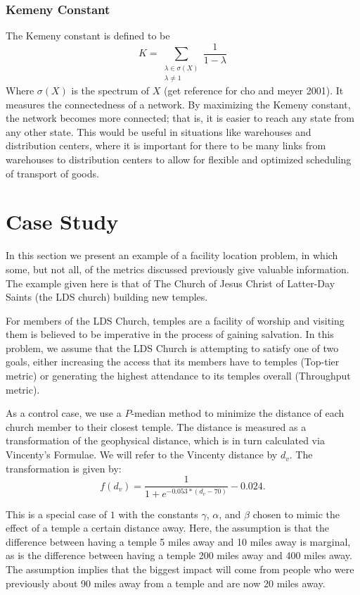 \documentclass[twoside,twocolumn]{article}
\begin{document}
\subsubsection{Kemeny Constant}
The Kemeny constant is defined to be 
$$K = \sum_{\substack{\lambda \in \sigma(X) \\ \lambda \neq 1}} \frac{1}{1-\lambda}$$
Where $\sigma(X)$ is the spectrum of $X$ (get reference for cho and meyer 2001).
It measures the connectedness of a network.
By maximizing the Kemeny constant, the network becomes more connected; that is, it is easier to reach any state from any other state.
This would be useful in situations like warehouses and distribution centers, where it is important for there to be many links from warehouses to distribution centers to allow for flexible and optimized scheduling of transport of goods.

\section{Case Study}

In this section we present an example of a facility location problem, in which some, but not all, of the metrics discussed previously give valuable information. 
The example given here is that of The Church of Jesus Christ of Latter-Day Saints (the LDS church) building new temples.


For members of the LDS Church, temples are a facility of worship and visiting them is believed to be imperative in the process of gaining salvation.
In this problem, we assume that the LDS Church is attempting to satisfy one of two goals, either increasing the access that its members have to temples (Top-tier metric) or generating the highest attendance to its temples overall (Throughput metric).

As a control case, we use a $P$-median method to minimize the distance of each church member to their closest temple.
The distance is measured as a transformation of the geophysical distance, which is in turn calculated via Vincenty's Formulae. %
We will refer to the Vincenty distance by $d_{v}$. %
The transformation is given by:
\begin{equation}
f(d_{v}) = \frac{1}{1+e^{-0.053*(d_{v} - 70)}} - 0.024.
\end{equation}

This is a special case of \(1\) with the constants $\gamma$, $\alpha$, and $\beta$ chosen to mimic the effect of a temple a certain distance away.
Here, the assumption is that the difference between having a temple 5 miles away and 10 miles away is marginal, as is the difference between having a temple 200 miles away and 400 miles away.
The assumption implies that the biggest impact will come from people who were previously about 90 miles away from a temple and are now 20 miles away.
\end{document}

